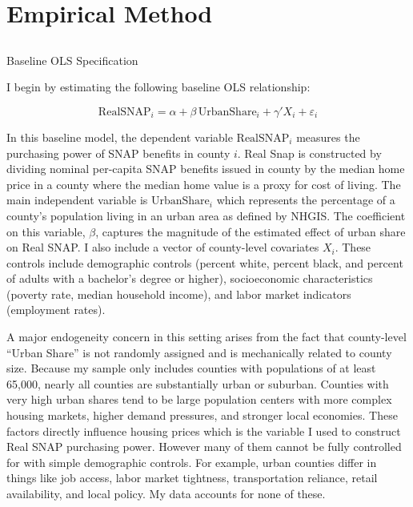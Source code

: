 \documentclass{article}
\begin{document}
\section{Empirical Method}

\subsection{}{Baseline OLS Specification}

I begin by estimating the following baseline OLS relationship:

\begin{equation}
    \text{RealSNAP}_i = \alpha + \beta \,\text{UrbanShare}_i + \gamma' X_i + \varepsilon_i
\end{equation}

In this baseline model, the dependent variable $\text{RealSNAP}_i$ measures the purchasing power of SNAP benefits in county $i$. Real Snap is constructed by dividing nominal per-capita SNAP benefits issued in county by the median home price in a county where the median home value is a proxy for cost of living. The main independent variable is $\text{UrbanShare}_i$ which represents the percentage of a county's population living in an urban area as defined by NHGIS. The coefficient on this variable, $\beta$, captures the magnitude of the estimated effect of urban share on Real SNAP. I also include a vector of county-level covariates $X_i$. These controls include demographic controls (percent white, percent black, and percent of adults with a bachelor's degree or higher), socioeconomic characteristics (poverty rate, median household income), and labor market indicators (employment rates).

A major endogeneity concern in this setting arises from the fact that county-level “Urban Share” is not randomly assigned and is mechanically related to county size. Because my sample only includes counties with populations of at least 65,000, nearly all counties are substantially urban or suburban. Counties with very high urban shares tend to be large population centers with more complex housing markets, higher demand pressures, and stronger local economies. These factors directly influence housing prices which is the variable I used to construct Real SNAP purchasing power. However many of them cannot be fully controlled for with simple demographic controls. For example, urban counties differ in things like job access, labor market tightness, transportation reliance, retail availability, and local policy. My data accounts for none of these. 
\end{document}
